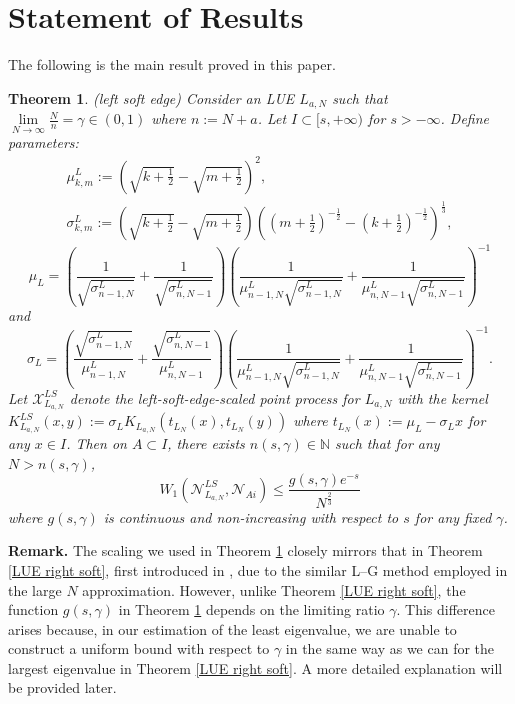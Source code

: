 \documentclass[11pt]{article}
\newtheorem{theorem}{Theorem}[section]
\numberwithin{equation}{section}%
\numberwithin{theorem}{section}
\begin{document}
\section{Statement of Results}\label{Sec: Results}
The following is the main result proved in this paper.
\begin{theorem}\label{LUE left soft}
   (left soft edge) Consider an LUE $L_{a,N}$ such that $\lim\limits_{N\rightarrow\infty}\frac{N}{n}=\gamma\in(0,1)$ where $n:=N+a$. Let $I\subset[s,+\infty)$ for $s>-\infty$. Define parameters:
    \begin{equation*}
      \begin{array}{ll}
      \mu^L_{k,m}:=\left(\sqrt{k+\frac{1}{2}}-\sqrt{m+\frac{1}{2}}\right)^2,\\
      \sigma^L_{k,m}:=\left(\sqrt{k+\frac{1}{2}}-\sqrt{m+\frac{1}{2}}\right)\left(\left(m+\frac{1}{2}\right)^{-\frac{1}{2}}-\left(k+\frac{1}{2}\right)^{-\frac{1}{2}}\right)^{\frac{1}{3}},
      \end{array}
    \end{equation*}
\begin{equation*}
    \mu_L=\left(\frac{1}{\sqrt{\sigma_{n-1,N}^{L}}}+\frac{1}{\sqrt{\sigma_{n,N-1}^{L}}}\right)\left(\frac{1}{\mu^L_{n-1,N}\sqrt{\sigma_{n-1,N}^L}}+\frac{1}{\mu^L_{n,N-1}\sqrt{\sigma_{n,N-1}^{L}}}\right)^{-1}
\end{equation*}
and
\begin{equation*}
    \sigma_L=\left(\frac{\sqrt{\sigma_{n-1,N}^{L}}}{\mu^L_{n-1,N}}+\frac{\sqrt{\sigma_{n,N-1}^{L}}}{\mu^L_{n,N-1}}\right)\left(\frac{1}{\mu^L_{n-1,N}\sqrt{\sigma_{n-1,N}^{L}}}+\frac{1}{\mu^L_{n,N-1}\sqrt{\sigma_{n,N-1}^{L}}}\right)^{-1}.
\end{equation*}
Let $\mathcal{X}_{L_{a,N}}^{LS}$ denote the left-soft-edge-scaled point process for $L_{a,N}$ with the kernel $K_{L_{a,N}}^{LS}(x,y):=\sigma_{L}K_{L_{a,N}}(t_{L_{N}}(x),t_{L_{N}}(y))$ where $t_{L_N}(x):=\mu_{L}-\sigma_{L}x$ for any $x\in I$. Then on $A\subset I$, there exists $n(s,\gamma)\in\mathbb{N}$ such that for any $N>n(s,\gamma)$,
\begin{equation}\label{main L left soft}
W_1(\mathcal{N}_{L_{a,N}}^{LS},\mathcal{N}_{Ai})\le\frac{g(s,\gamma)e^{-s}}{N^{\frac{2}{3}}}
\end{equation}
where $g(s,\gamma)$ is continuous and non-increasing with respect to $s$ for any fixed $\gamma$.
\end{theorem}

\bigskip\noindent\textbf{ Remark.} The scaling we used in Theorem \ref{LUE left soft} closely mirrors that in Theorem \ref{LUE right soft}, first introduced in \cite{el2006rate}, due to the similar L–G method employed in the large 
$N$ approximation. However, unlike Theorem \ref{LUE right soft}, the function
$g(s,\gamma)$ in Theorem \ref{LUE left soft} depends on the limiting ratio $\gamma$. This difference arises because, in our estimation of the least eigenvalue, we are unable to construct a uniform bound with respect to $\gamma$ in the same way as we can for the largest eigenvalue in Theorem \ref{LUE right soft}. A more detailed explanation will be provided later.\bigskip
\end{document}
